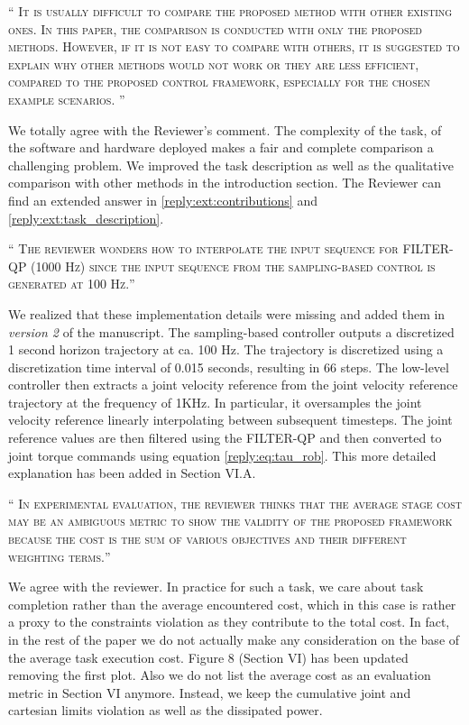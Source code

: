 \documentclass[10pt]{article}
\newcommand{\referee}[1]{\;
  \begin{minipage}[t]{.95\textwidth}
    ``{\small\color{red} \textsc{#1}}''
  \end{minipage}\medskip
  }
\newcommand{\version}[1]{\textit{version #1}}
\begin{document}
\begin{enumerate}[label={[R2:\,\arabic{enumi}]}]
\item\label{reply:R2:10} 
\referee{It is usually difficult to compare the proposed method with other existing ones. In this paper, the comparison is conducted with only the proposed methods. However, if it is not easy to compare with others, it is suggested to explain why other methods would not work or they are
less efficient, compared to the proposed control framework, especially for the chosen example scenarios.
}

We totally agree with the Reviewer's comment. The complexity of the task, of the software and hardware deployed makes a fair and complete comparison a challenging problem. We improved the task description as well as the qualitative comparison with other methods in the introduction section. The Reviewer can find an extended answer in \ref{reply:ext:contributions} and \ref{reply:ext:task_description}.

\item\label{reply:R2:11} 
\referee{The reviewer wonders how to interpolate the input sequence for FILTER-QP (1000 Hz) since the input sequence from the sampling-based control is generated at 100 Hz.}

We realized that these implementation details were missing and added them in \version{2} of the manuscript. The sampling-based controller outputs a discretized 1 second horizon trajectory at ca. 100 Hz. The trajectory is discretized using a discretization time interval of 0.015 seconds, resulting in 66 steps. The low-level controller then extracts a joint velocity reference from the joint velocity reference trajectory at the frequency of 1KHz. In particular, it oversamples the joint velocity reference linearly interpolating between subsequent timesteps. The joint reference values are then filtered using the FILTER-QP and then converted to joint torque commands using equation \eqref{reply:eq:tau_rob}. This more detailed explanation has been added in Section VI.A.

\item\label{reply:R2:12} 
\referee{In experimental evaluation, the reviewer thinks that the average stage cost may be an ambiguous metric to show the validity of the proposed framework because the cost is the sum of various objectives and their different weighting terms.}

We agree with the reviewer. In practice for such a task, we care about task completion rather than the average encountered cost, which in this case is rather a proxy to the constraints violation as they contribute to the total cost. In fact, in the rest of the paper we do not actually make any consideration on the base of the average task execution cost. Figure 8 (Section VI) has been updated removing the first plot. Also we do not list the average cost as an evaluation metric in Section VI anymore. Instead, we keep the cumulative joint and cartesian limits violation as well as the dissipated power.   


\end{enumerate}
\end{document}
